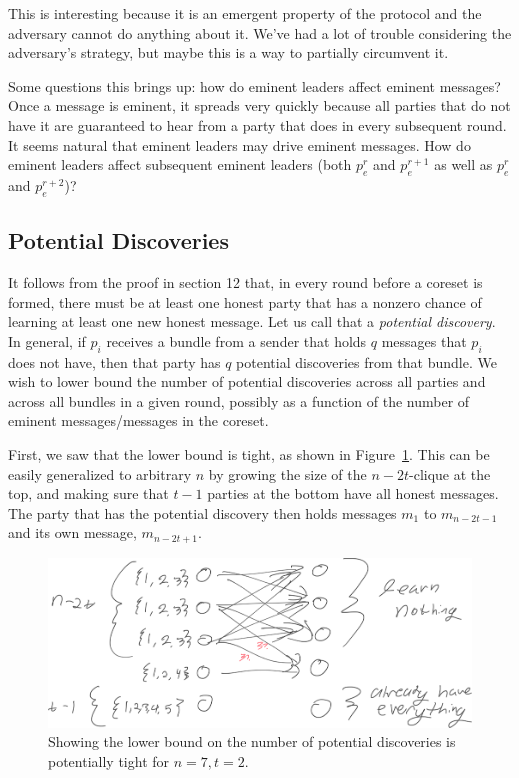 \documentclass{article}
\begin{document}
This is interesting because it is an emergent property of the protocol and the adversary cannot do anything about it. We've had a lot of trouble considering the adversary's strategy, but maybe this is a way to partially circumvent it.

Some questions this brings up: how do eminent leaders affect eminent messages? Once a message is eminent, it spreads very quickly because all parties that do not have it are guaranteed to hear from a party that does in every subsequent round. It seems natural that eminent leaders may drive eminent messages. How do eminent leaders affect subsequent eminent leaders (both $p_e^r$ and $p_e^{r+1}$ as well as $p_e^r$ and $p_e^{r+2}$)?

\subsection{Potential Discoveries}
It follows from the proof in section 12 that, in every round before a coreset is formed, there must be at least one honest party that has a nonzero chance of learning at least one new honest message. Let us call that a \emph{potential discovery}. In general, if $p_i$ receives a bundle from a sender that holds $q$ messages that $p_i$ does not have, then that party has $q$ potential discoveries from that bundle. We wish to lower bound the number of potential discoveries across all parties and across all bundles in a given round, possibly as a function of the number of eminent messages/messages in the coreset.

First, we saw that the lower bound is tight, as shown in Figure~\ref{fig:one-potential}. This can be easily generalized to arbitrary $n$ by growing the size of the $n-2t$-clique at the top, and making sure that $t-1$ parties at the bottom have all honest messages. The party that has the potential discovery then holds messages $m_1$ to $m_{n-2t-1}$ and its own message, $m_{n-2t+1}$.
\begin{figure}[h]
\centering
\includegraphics[scale=.4]{./figures/one-potential-discovery.png}
\caption{Showing the lower bound on the number of potential discoveries is potentially tight for $n=7, t=2$.}
\label{fig:one-potential}
\end{figure}
\end{document}
